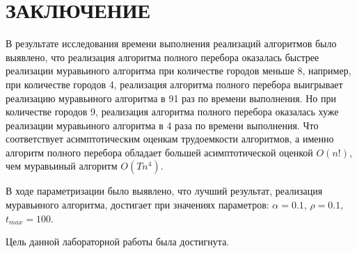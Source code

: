 \chapter*{ЗАКЛЮЧЕНИЕ}

В результате исследования времени выполнения реализаций алгоритмов было выявлено, что реализация алгоритма полного перебора оказалась быстрее реализации муравьиного алгоритма при количестве городов меньше 8, например, при количестве городов 4, реализация алгоритма полного перебора выигрывает реализацию муравьиного алгоритма в 91 раз по времени выполнения. 
Но при количестве городов 9, реализация алгоритма полного перебора оказалась хуже реализации муравьиного алгоритма в 4 раза по времени выполнения.
Что соответствует асимптотическим оценкам трудоемкости алгоритмов, а именно алгоритм полного перебора обладает большей асимптотической оценкой $O(n!)$, чем муравьиный алгоритм $O(Tn^4)$.

В ходе параметризации было выявлено, что лучший результат, реализация муравьиного алгоритма, достигает при значениях параметров: $\alpha = 0.1$, $\rho = 0.1$, $t_{max} = 100$.

Цель данной лабораторной работы была достигнута.